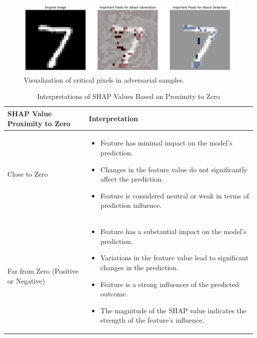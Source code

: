 \documentclass[10pt, conference, a4paper, final]{IEEEtran}
\begin{document}
    \begin{figure}[h]
        \centering
        \includegraphics[width=\linewidth]{paper_images/criticalpixels.png}
        \caption{Visualization of critical pixels in adversarial samples.}
        \label{fig:adversarial}
    \end{figure}
    

    \begin{table}[t]
        \centering
        \begin{tabular}{|p{3cm}|p{6cm}|}
        \hline
        \textbf{SHAP Value Proximity to Zero} & \textbf{Interpretation} \\ \hline
        Close to Zero & 
        \begin{itemize}
        \item Feature has minimal impact on the model's prediction.
        \item Changes in the feature value do not significantly affect the prediction.
        \item Feature is considered neutral or weak in terms of prediction influence.
        \end{itemize}
        \\ \hline
        Far from Zero (Positive or Negative) & 
        \begin{itemize}
        \item Feature has a substantial impact on the model's prediction.
        \item Variations in the feature value lead to significant changes in the prediction.
        \item Feature is a strong influencer of the predicted outcome.
        \item The magnitude of the SHAP value indicates the strength of the feature's influence.
        \end{itemize}
        \\ \hline
        \end{tabular}
        \caption{Interpretations of SHAP Values Based on Proximity to Zero}
        \label{table:shap-value-interpretation}
    \end{table}
    
\end{document}

